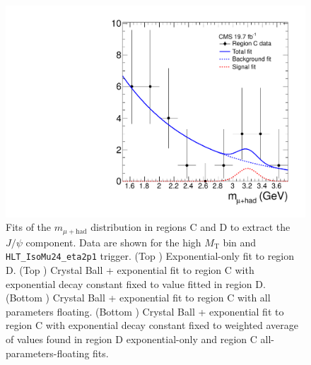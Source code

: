 \begin{figure}[hbtp]
\begin{center}
    \includegraphics[width=\cmsFigWidth]{figures/frame_muHadMass_m0p996382_0_0_weightedAvgkFixed_HLT_IsoMu24_eta2p1}
    \caption{Fits of the $m_{\mu+\text{had}}$ distribution in regions C and D to extract the $J\slash\psi$ component.  Data are shown for the high $M_{\text{T}}$ bin and \texttt{HLT\_IsoMu24\_eta2p1} trigger.  (Top \cmsLeft) Exponential-only fit to region D.  (Top \cmsRight) Crystal Ball + exponential fit to region C with exponential decay constant fixed to value fitted in region D.  (Bottom \cmsLeft) Crystal Ball + exponential fit to region C with all parameters floating.  (Bottom \cmsRight) Crystal Ball + exponential fit to region C with exponential decay constant fixed to weighted average of values found in region D exponential-only and region C all-parameters-floating fits.}
    \label{fig:regC-regD-fit-IsoMu24}
  \end{center}
\end{figure}

